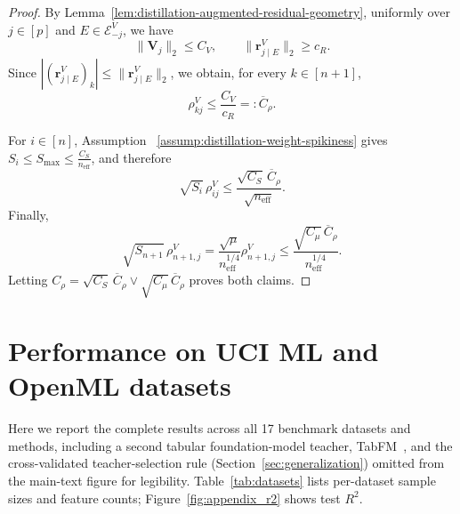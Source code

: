 \documentclass[12pt]{article}
\theoremstyle{definition}
\begin{document}
\begin{proof}
By Lemma~\ref{lem:distillation-augmented-residual-geometry},
uniformly over $j\in[p]$ and $E\in\mathcal E_{-j}^V$, we have
\[
    \|\boldsymbol V_j\|_2\le C_V,
    \qquad
    \|\boldsymbol r_{j\mid E}^V\|_2\ge c_R.
\]
Since  $|(\boldsymbol r_{j\mid E}^V)_k|\le \|\boldsymbol r_{j\mid E}^V\|_2$,
we obtain, for every $k\in[n+1]$,
\[
    \rho_{kj}^V
    \le
    \frac{C_V}{c_R}
    =:\overline C_\rho.
\]

For $i\in[n]$, Assumption~%
\ref{assump:distillation-weight-spikiness} gives $S_i\le S_{\max}\le \frac{C_S}{n_{\mathrm{eff}}}$, and therefore
\[
    \sqrt{S_i}\,\rho_{ij}^V
    \le
    \frac{\sqrt{C_S}\,\overline C_\rho}
         {\sqrt{n_{\mathrm{eff}}}}.
\]
Finally,
\[
    \sqrt{S_{n+1}}\,\rho_{n+1,j}^V
    =
    \frac{\sqrt{\mu}}{n_{\mathrm{eff}}^{1/4}}
    \rho_{n+1,j}^V
    \le
    \frac{\sqrt{C_\mu}\,\overline C_\rho}
         {n_{\mathrm{eff}}^{1/4}}.
\]
Letting $C_\rho=\sqrt{C_S}\,\overline C_\rho \vee \sqrt{C_\mu}\,\overline C_\rho$ proves both claims.
\end{proof}

\section{Performance on UCI ML and OpenML datasets}
\label{app:real_data}

Here we report the complete results across all 17 benchmark datasets and methods, including a second tabular foundation-model teacher, TabFM~\citep{kong2026tabfm}, and the cross-validated teacher-selection rule (Section~\ref{sec:generalization}) omitted from the main-text figure for legibility. Table~\ref{tab:datasets} lists per-dataset sample sizes and feature counts; Figure~\ref{fig:appendix_r2} shows test $R^2$.
\end{document}
